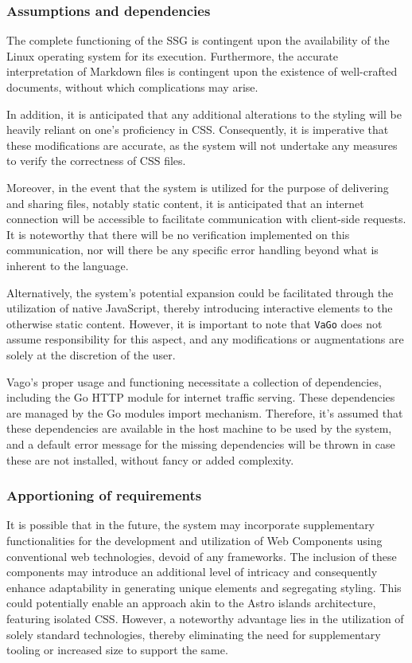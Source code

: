 \subsubsection{Assumptions and
dependencies}\label{subsubsec:assumptions-and-dependencies}

The complete functioning of the SSG is contingent upon the availability
of the Linux operating system for its execution. Furthermore, the
accurate interpretation of Markdown files is contingent upon the
existence of well-crafted documents, without which complications may
arise.

In addition, it is anticipated that any additional alterations to the
styling will be heavily reliant on one's proficiency in CSS.
Consequently, it is imperative that these modifications are accurate, as
the system will not undertake any measures to verify the correctness of
CSS files.

Moreover, in the event that the system is utilized for the purpose of
delivering and sharing files, notably static content, it is anticipated
that an internet connection will be accessible to facilitate
communication with client-side requests. It is noteworthy that there
will be no verification implemented on this communication, nor will
there be any specific error handling beyond what is inherent to the
language.

Alternatively, the system's potential expansion could be facilitated
through the utilization of native JavaScript, thereby introducing
interactive elements to the otherwise static content. However, it is
important to note that \texttt{VaGo} does not assume responsibility for
this aspect, and any modifications or augmentations are solely at the
discretion of the user.

Vago's proper usage and functioning necessitate a collection of
dependencies, including the Go HTTP module for internet traffic serving.
These dependencies are managed by the Go modules import mechanism.
Therefore, it's assumed that these dependencies are available in the
host machine to be used by the system, and a default error message for
the missing dependencies will be thrown in case these are not installed,
without fancy or added complexity.

\subsubsection{Apportioning of
requirements}\label{subsubsec:apportioning-of-requirements}

It is possible that in the future, the system may incorporate
supplementary functionalities for the development and utilization of Web
Components using conventional web technologies, devoid of any
frameworks. The inclusion of these components may introduce an
additional level of intricacy and consequently enhance adaptability in
generating unique elements and segregating styling. This could
potentially enable an approach akin to the Astro islands architecture,
featuring isolated CSS. However, a noteworthy advantage lies in the
utilization of solely standard technologies, thereby eliminating the
need for supplementary tooling or increased size to support the same.

